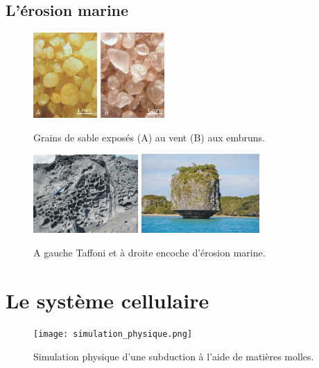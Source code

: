 \documentclass{beamer}
\begin{document}
\subsection{L'érosion marine}
\begin{frame}
  \begin{center}
    \begin{figure}
      \includegraphics[width=5cm]{Images/Diapos/Erosion/marine/A_vent_B_mer.jpg}
      \caption{Grains de sable exposés (A) au vent (B) aux embruns.}
      \includegraphics[width=4cm]{Images/Diapos/Erosion/marine/taffoni.jpg}
      \includegraphics[width=4.5cm]{Images/Diapos/Erosion/marine/upi.jpg}
      \caption{A gauche Taffoni et à droite encoche d'érosion marine.}
    \end{figure}
  \end{center}
\end{frame}

\section{Le système cellulaire}
\begin{frame}
  \begin{figure}
    \begin{center}
      \texttt{[image: simulation\_physique.png]}
      \caption{Simulation physique d'une subduction à l'aide de matières molles.}
    \end{center}
  \end{figure}
\end{frame}
\end{document}
